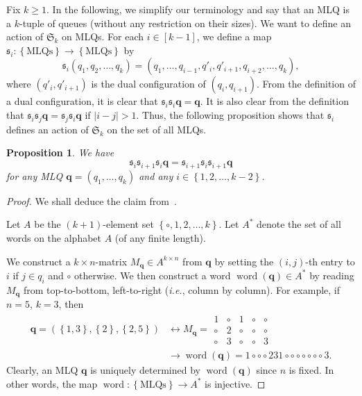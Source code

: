 \documentclass[reqno]{amsart}
\newcommand{\0}{\phantom{c}}
\newcommand{\SymGp}[1]{\mathfrak{S}_{#1}} %
\newcommand{\qq}{\mathbf{q}}
\newcommand{\fraks}{\mathfrak{s}}
\newenvironment{verlong}{}{}
\newcommand{\word}{\operatorname{word}}
\newcommand{\set}[1]{\left\{ #1 \right\}}
\newcommand{\abs}[1]{\left| #1 \right|}
\newcommand{\tup}[1]{\left( #1 \right)}
\newcommand{\ive}[1]{\left[ #1 \right]}
\theoremstyle{plain}
\newtheorem{prop}[thm]{Proposition}
\theoremstyle{definition}
\numberwithin{equation}{section}
\begin{document}
\begin{verlong}
Fix $k \geq 1$.
In the following, we simplify our terminology and say that an MLQ
is a $k$-tuple of queues (without any restriction on their sizes).
We want to define an action of $\SymGp{k}$ on MLQs.
For each $i \in \ive{k-1}$, we define a map $\fraks_i \colon \set{\text{MLQs}} \to \set{\text{MLQs}}$ by
\[
\fraks_i(q_1, q_2, \dotsc, q_k) = (q_1, \dotsc, q_{i-1}, q'_i, q'_{i+1}, q_{i+2}, \dotsc, q_k),
\]
where $\tup{q'_i, q'_{i+1}}$ is the dual configuration of $\tup{q_i, q_{i+1}}$.
From the definition of a dual configuration, it is clear that $\fraks_i \fraks_i \qq = \qq$.
It is also clear from the definition that $\fraks_i \fraks_j \qq = \fraks_j \fraks_i \qq$ if $\abs{i - j} > 1$.
Thus, the following proposition shows that $\fraks_i$ defines an action of $\SymGp{k}$ on the set of all MLQs.

\begin{prop} \label{prop:braid-old6}
We have
\[
\fraks_i \fraks_{i+1} \fraks_i \qq
	   = \fraks_{i+1} \fraks_i \fraks_{i+1} \qq
\]
for any MLQ $\qq = \tup{q_1, \dotsc, q_k}$ and any $i \in \set{1, 2, \ldots, k-2}$.
\end{prop}

\begin{proof}
We shall deduce the claim from~\cite[Ch.~5, (5.6.3)]{Loth}.

Let $A$ be the $\tup{k+1}$-element set $\set{\circ, 1, 2, \ldots, k}$.
Let $A^*$ denote the set of all words on the alphabet $A$
(of any finite length).

We construct a $k \times n$-matrix $M_{\qq} \in A^{k \times n}$ from $\qq$ by setting the $\tup{i, j}$-th
entry to $i$ if $j \in q_i$ and $\circ$ otherwise.
We then construct a word $\word(\qq) \in A^*$ by reading $M_{\qq}$ from top-to-bottom, left-to-right (\textit{i.e.}, column by column).
For example, if $n = 5$, $k = 3$, then
\begin{align*}
\qq = \tup{\set{1, 3}, \set{2},
\set{2, 5}}
& \longleftrightarrow
 M_{\qq}
 =
 \begin{array}{ccccc}
  1 & \circ & 1 & \circ & \circ \\
  \circ & 2 & \circ  & \circ & \circ \\
  \circ & 3  & \circ & \circ & 3
 \end{array}
 \\ & \longrightarrow
 \word(\qq) = 1 \circ \circ \circ 2 3 1 \circ \circ \circ \circ \circ \circ \circ 3 .
\end{align*}
Clearly, an MLQ $\qq$ is uniquely determined by $\word(\qq)$ since $n$ is fixed.
In other words, the map $\word \colon \set{\text{MLQs}} \to A^*$
is injective.


\end{proof}
\end{verlong}
\end{document}
